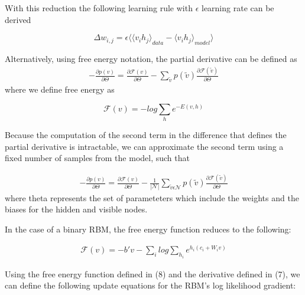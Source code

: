 \documentclass[journal]{IEEEtran}
\begin{document}
With this reduction the following learning rule with $\epsilon$ learning rate can be derived

\begin{equation}
\Delta w_{i,j} = \epsilon\langle{\langle v_{i} h_{j} \rangle}_{data} - {\langle v_{i} h_{j} \rangle}_{model}\rangle 
\end{equation} 

Alternatively, using free energy notation, the partial derivative can be defined as
\begin{equation}
\begin{aligned}
- \frac{\partial p(v)}{\partial \Theta} = \frac{\partial \mathcal{F}(v)}{\partial \Theta} - \sum\limits_{\tilde{v}}p(\tilde{v}) \frac{\partial \mathcal{F}(\tilde{v})}{\partial \Theta}
\end{aligned}
\end{equation} where we define free energy as 

\begin{equation}
\mathcal{F}(v) = -log \sum\limits_{h}e^{-E(v,h)}
\end{equation}

Because the computation of the second term in the difference that defines the partial derivative is intractable, we can approximate the second term using a fixed number of samples from the model, such that 

\begin{equation}
\begin{aligned}
- \frac{\partial p(v)}{\partial \Theta} = \frac{\partial \mathcal{F}(v)}{\partial \Theta} -\frac{1}{|\mathcal{N}|} \sum\limits_{\tilde{v} \epsilon \mathcal{N}} p(\tilde{v}) \frac{\partial \mathcal{F}(\tilde{v})}{\partial \Theta}
\end{aligned}
\end{equation} where theta represents the set of parameteters which include the weights and the biases for the hidden and visible nodes.

In the case of a binary RBM, the free energy function reduces to the following:

\begin{equation}
\begin{aligned}
\mathcal{F}(v) = -b'v - \sum\limits_{i}log\sum\limits_{h_{i}}e^{h_{i}(c_{i}+W_{i}v)}
\end{aligned}
\end{equation}

Using the free energy function defined in (8) and the derivative defined in (7), we can define the following update equations for the RBM's log likelihood gradient:
\end{document}
